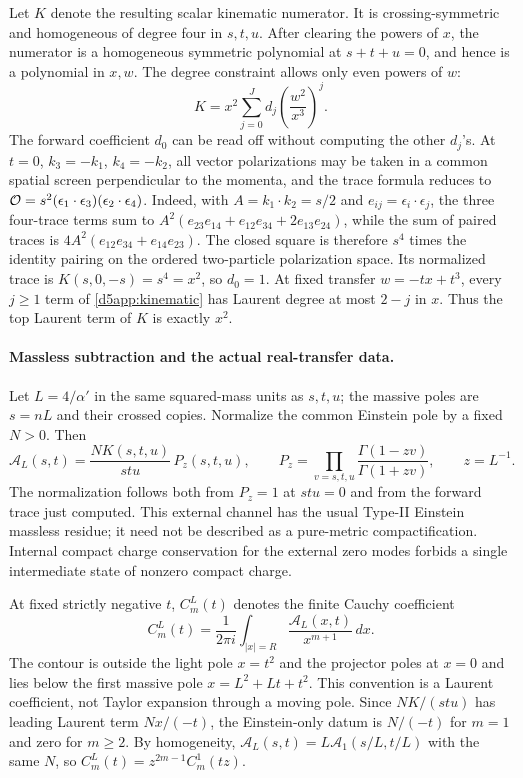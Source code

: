 \documentclass[11pt]{article}
\begin{document}
Let \(K\) denote the resulting scalar kinematic numerator. It is
crossing-symmetric and homogeneous of degree four in \(s,t,u\).
After clearing the powers of \(x\), the numerator is a homogeneous
symmetric polynomial at \(s+t+u=0\), and hence is a polynomial in
\(x,w\). The degree constraint allows only even powers of \(w\):
\begin{equation}
 K=x^2\sum_{j=0}^{J}d_j\left(\frac{w^2}{x^3}\right)^j .
 \label{d5app:kinematic}
\end{equation}
The forward coefficient \(d_0\) can be read off without computing the
other \(d_j\)'s. At \(t=0\), \(k_3=-k_1\), \(k_4=-k_2\), all vector
polarizations may be taken in a common spatial screen perpendicular
to the momenta, and the trace formula reduces to
\({\cal O}=s^2(\epsilon_1\cdot\epsilon_3)(\epsilon_2\cdot\epsilon_4)\).
Indeed, with \(A=k_1\cdot k_2=s/2\) and
\(e_{ij}=\epsilon_i\cdot\epsilon_j\), the three four-trace terms sum
to \(A^2(e_{23}e_{14}+e_{12}e_{34}+2e_{13}e_{24})\), while the
sum of paired traces is \(4A^2(e_{12}e_{34}+e_{14}e_{23})\).
The closed square is therefore \(s^4\) times the identity pairing
on the ordered two-particle polarization space. Its normalized trace
is \(K(s,0,-s)=s^4=x^2\), so \(d_0=1\).
At fixed transfer \(w=-tx+t^3\), every \(j\ge1\) term of
\eqref{d5app:kinematic} has Laurent degree at most \(2-j\) in \(x\).
Thus the top Laurent term of \(K\) is exactly \(x^2\).

\paragraph{Massless subtraction and the actual real-transfer data.}
Let \(L=4/\alpha'\) in the same squared-mass units as \(s,t,u\);
the massive poles are \(s=nL\) and their crossed copies. Normalize the
common Einstein pole by a fixed \(N>0\). Then
\begin{equation}
 \mathcal A_L(s,t)=\frac{NK(s,t,u)}{stu}\,P_z(s,t,u),\qquad
 P_z=\prod_{v=s,t,u}\frac{\Gamma(1-zv)}{\Gamma(1+zv)},\qquad z=L^{-1}.
 \label{d5app:full}
\end{equation}
The normalization follows both from \(P_z=1\) at \(stu=0\) and from
the forward trace just computed. This external channel has the
usual Type-II Einstein massless residue; it need not be described
as a pure-metric compactification. Internal compact charge
conservation for the external zero modes forbids a single
intermediate state of nonzero compact charge.

At fixed strictly negative \(t\), \(C_m^L(t)\) denotes the finite
Cauchy coefficient
\[
 C_m^L(t)=\frac{1}{2\pi i}\int_{|x|=R}
                   \frac{\mathcal A_L(x,t)}{x^{m+1}}\,dx .
\]
The contour is outside the light pole \(x=t^2\) and the projector
poles at \(x=0\) and lies below the first massive pole
\(x=L^2+Lt+t^2\). This convention is a Laurent coefficient, not Taylor
expansion through a moving pole. Since \(NK/(stu)\) has leading
Laurent term \(Nx/(-t)\), the Einstein-only datum is \(N/(-t)\) for
\(m=1\) and zero for \(m\ge2\). By homogeneity,
\(\mathcal A_L(s,t)=L\mathcal A_1(s/L,t/L)\) with the same \(N\),
so \(C_m^L(t)=z^{2m-1}C_m^1(tz)\).
\end{document}
